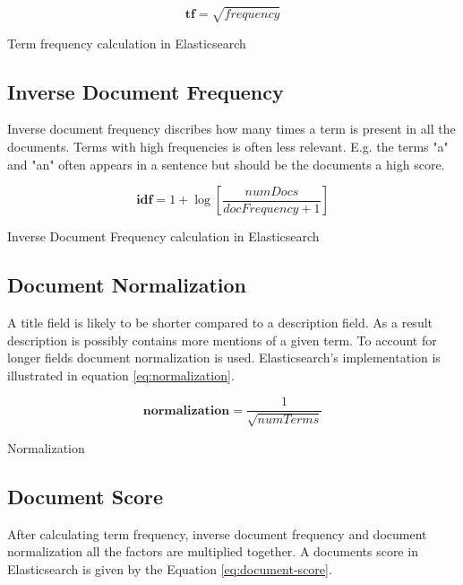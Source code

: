 \begin{cequation}[H]
	\begin{equation}
		\mathbf{tf} = \sqrt{frequency}
	\end{equation}
	\caption{Term frequency calculation in Elasticsearch}
  \label{eq:term-frequency}
\end{cequation}

\subsection{Inverse Document Frequency}
Inverse document frequency discribes how many times a term is present in all the documents.
Terms with high frequencies is often less relevant.
E.g. the terms "a" and "an" often appears in a sentence but should be the documents a high score.

\begin{cequation}[H]
	\begin{equation}
		\mathbf{idf} = 1 + \log{[\frac{numDocs}{docFrequency + 1}]}
	\end{equation}
	\caption{Inverse Document Frequency calculation in Elasticsearch}
  \label{eq:idf}
\end{cequation}

\subsection{Document Normalization}
A title field is likely to be shorter compared to a description field.
As a result description is possibly contains more mentions of a given term.
To account for longer fields document normalization is used.
Elasticsearch's implementation is illustrated in equation \ref{eq:normalization}.

\begin{cequation}[H]
	\begin{equation}
		\mathbf{normalization} = \frac{1}{\sqrt{numTerms}}
	\end{equation}
	\caption{Normalization}
  \label{eq:normalization}
\end{cequation}

\subsection{Document Score}
\label{sec:doc-score}
After calculating term frequency, inverse document frequency and document normalization all the factors are multiplied together.
A documents score in Elasticsearch is given by the Equation \ref{eq:document-score}.

